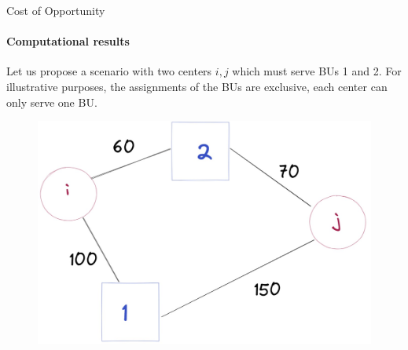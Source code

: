 \documentclass{beamer}
\begin{document}
\begin{frame}{Cost of Opportunity}
    \framesubtitle{Computational results}
    Let us propose a scenario with two centers $i, j$ which must serve BUs 1 and 2. For illustrative purposes, the assignments of the BUs are exclusive, each center can only serve one BU.
    \begin{figure}
        \centering
        \includegraphics[scale=0.25]{datos_1_opp}
    \end{figure}
\end{frame}
\end{document}
